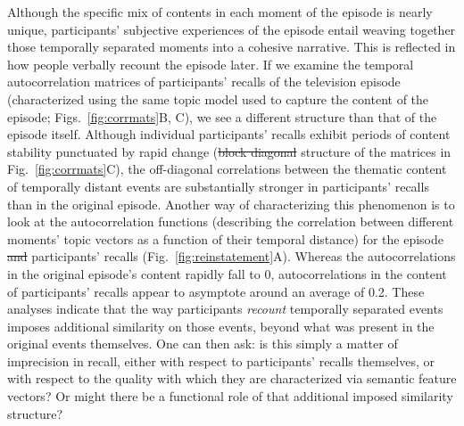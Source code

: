 \documentclass{article}
\providecommand{\DIFaddtex}[1]{{\protect\color{blue}\uwave{#1}}} %
\providecommand{\DIFdeltex}[1]{{\protect\color{red}\sout{#1}}}                      %
\providecommand{\DIFaddbegin}{} %
\providecommand{\DIFaddend}{} %
\providecommand{\DIFdelbegin}{} %
\providecommand{\DIFdelend}{} %
\providecommand{\DIFadd}[1]{\texorpdfstring{\DIFaddtex{#1}}{#1}} %
\providecommand{\DIFdel}[1]{\texorpdfstring{\DIFdeltex{#1}}{}} %
\newcommand{\DIFscaledelfig}{0.5}
\newlength{\DIFdelgraphicswidth} %
\newlength{\DIFdelgraphicsheight} %
\newcommand{\DIFaddincludegraphics}[2][]{{\color{blue}\fbox{\DIFOincludegraphics[#1]{#2}}}} %
\newcommand{\DIFdelincludegraphics}[2][]{%
\sbox{\DIFdelgraphicsbox}{\DIFOincludegraphics[#1]{#2}}%
\settoboxwidth{\DIFdelgraphicswidth}{\DIFdelgraphicsbox} %
\settoboxtotalheight{\DIFdelgraphicsheight}{\DIFdelgraphicsbox} %
\scalebox{\DIFscaledelfig}{%
\parbox[b]{\DIFdelgraphicswidth}{\usebox{\DIFdelgraphicsbox}\\[-\baselineskip] \rule{\DIFdelgraphicswidth}{0em}}\llap{\resizebox{\DIFdelgraphicswidth}{\DIFdelgraphicsheight}{%
\setlength{\unitlength}{\DIFdelgraphicswidth}%
\begin{picture}(1,1)%
\thicklines\linethickness{2pt} %
{\color[rgb]{1,0,0}\put(0,0){\framebox(1,1){}}}%
{\color[rgb]{1,0,0}\put(0,0){\line( 1,1){1}}}%
{\color[rgb]{1,0,0}\put(0,1){\line(1,-1){1}}}%
\end{picture}%
}\hspace*{3pt}}} %
} %
\DeclareRobustCommand{\DIFaddbegin}{\DIFOaddbegin \let\includegraphics\DIFaddincludegraphics} %
\DeclareRobustCommand{\DIFaddend}{\DIFOaddend \let\includegraphics\DIFOincludegraphics} %
\DeclareRobustCommand{\DIFdelbegin}{\DIFOdelbegin \let\includegraphics\DIFdelincludegraphics} %
\DeclareRobustCommand{\DIFdelend}{\DIFOaddend \let\includegraphics\DIFOincludegraphics} %
\begin{document}
Although the specific mix of contents in each moment of the episode is nearly unique, participants' subjective experiences of the episode entail weaving together those temporally separated moments into a cohesive narrative.  This is reflected in how people verbally recount the episode later.  If we examine the temporal autocorrelation matrices of participants' recalls of the television episode (characterized using the same topic model used to capture the content of the episode; Figs.~\ref{fig:corrmats}B, C), we see a different structure than that of the episode itself.  Although individual participants' recalls \DIFaddbegin \DIFadd{also }\DIFaddend exhibit periods of content stability punctuated by rapid change (\DIFdelbegin \DIFdel{block diagonal }\DIFdelend \DIFaddbegin \DIFadd{visible in the blocky }\DIFaddend structure of the matrices in Fig.~\ref{fig:corrmats}C), the off-diagonal correlations between the thematic content of temporally distant events are substantially stronger in participants' recalls than in the original episode.  Another way of characterizing this phenomenon is to look at the autocorrelation functions (describing the correlation between different moments' topic vectors as a function of their temporal distance) for the episode \DIFdelbegin \DIFdel{and }\DIFdelend \DIFaddbegin \DIFadd{versus }\DIFaddend participants' recalls (Fig.~\ref{fig:reinstatement}A).  Whereas the autocorrelations in the original episode's content rapidly fall to 0, autocorrelations in the content of participants' recalls appear to asymptote around an average of 0.2.  These analyses indicate that the way participants \textit{recount} temporally separated events imposes additional similarity on those events, beyond what was present in the original events themselves.  One can then ask: is this simply a matter of imprecision in recall, either with respect to participants' recalls themselves, or with respect to the quality with which they are characterized via semantic feature vectors?  Or might there be a functional role of that additional imposed similarity structure?
\end{document}
